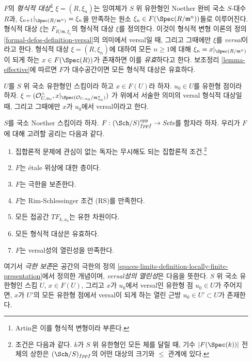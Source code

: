 \medskip\noindent
$F$의 {\it 형식적 대상}\footnote{Artin은 이를 형식적 변형이라 부른다.}
$\xi = (R, \xi_n)$는 잉여체가 $S$ 위 유한형인 Noether 완비 국소
$S$-대수 $R$과, $\xi_{n + 1}|_{\Spec(R/\mathfrak m^n)} = \xi_n$을
만족하는 원소 $\xi_n \in F(\Spec(R/\mathfrak m^n))$들로 이루어진다.
형식적 대상 $\xi$는 $F_{R/\mathfrak m, \xi_1}$의 형식적 대상 $\xi$를
정의한다. 이것이 형식적 변형 이론의
정의 \ref{formal-defos-definition-versal}의 의미에서 versal일 때,
그리고 그때에만 $\xi$를 {\it versal}이라고 한다.
형식적 대상 $\xi = (R, \xi_n)$에 대하여 모든 $n \geq 1$에 대해
$\xi_n = x|_{\Spec(R/\mathfrak m^n)}$이 되게 하는
$x \in F(\Spec(R))$가 존재하면 이를 {\it 유효}하다고 한다.
보조정리 \ref{lemma-effective}에 따르면 $F$가 대수공간이면 모든
형식적 대상은 유효하다.

\medskip\noindent
$U$를 $S$ 위 국소 유한형인 스킴이라 하고 $x \in F(U)$라 하자.
$u_0 \in U$를 유한형 점이라 하자.
$\xi = (\mathcal{O}_{U, u_0}^\wedge,
x|_{\Spec(\mathcal{O}_{U, u_0}/\mathfrak m_{u_0}^n)})$
가 위에서 서술한 의미의 versal 형식적 대상일 때, 그리고 그때에만
$x$가 $u_0$에서 versal이라고 한다.

\medskip\noindent
$S$를 국소 Noether 스킴이라 하자.
$F : (\Sch/S)_{fppf}^{opp} \to \textit{Sets}$를 함자라 하자.
우리가 $F$에 대해 고려할 공리는 다음과 같다.
\begin{enumerate}
\item[{[-1]}] 집합론적 문제에 관심이 없는 독자는 무시해도 되는
집합론적 조건.\footnote{조건은 다음과 같다. $k$가 $S$ 위 유한형인
모든 체를 달릴 때, 기수 $|F(\Spec(k))|$ 전체의 상한은
$(\Sch/S)_{fppf}$의 어떤 대상의 크기와 $\leq$ 관계에 있다.}
\item[{[0]}] $F$는 \'etale 위상에 대한 층이다.
\item[{[1]}] $F$는 극한을 보존한다.
\item[{[2]}] $F$는 Rim-Schlessinger 조건 (RS)를 만족한다.
\item[{[3]}] 모든 접공간 $TF_{k, x_0}$는 유한 차원이다.
\item[{[4]}] 모든 형식적 대상은 유효하다.
\item[{[5]}] $F$는 versal성의 열린성을 만족한다.
\end{enumerate}
여기서 {\it 극한 보존}은 공간의 극한의
정의 \ref{spaces-limits-definition-locally-finite-presentation}에서
정의한 개념이며, {\it versal성의 열린성}은 다음을 뜻한다.
$S$ 위 국소 유한형인 스킴 $U$, $x \in F(U)$, 그리고 $x$가
$u_0$에서 versal인 유한형 점 $u_0 \in U$가 주어지면,
$x$가 $U'$의 모든 유한형 점에서 versal이 되게 하는 열린 근방
$u_0 \in U' \subset U$가 존재한다.






